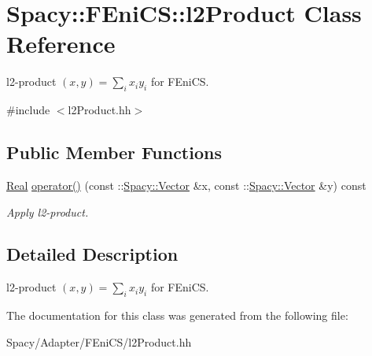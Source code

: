 \hypertarget{classSpacy_1_1FEniCS_1_1l2Product}{}\section{Spacy\+:\+:F\+Eni\+C\+S\+:\+:l2\+Product Class Reference}
\label{classSpacy_1_1FEniCS_1_1l2Product}


l2-\/product $(x,y) = \sum_i x_i y_i $ for F\+Eni\+C\+S.  




{\ttfamily \#include $<$l2\+Product.\+hh$>$}

\subsection*{Public Member Functions}
\begin{DoxyCompactItemize}
\item 
\hypertarget{classSpacy_1_1FEniCS_1_1l2Product_a795fc0d8cbced556168163265ac21406}{}\hyperlink{classSpacy_1_1Real}{Real} \hyperlink{classSpacy_1_1FEniCS_1_1l2Product_a795fc0d8cbced556168163265ac21406}{operator()} (const \+::\hyperlink{classSpacy_1_1Vector}{Spacy\+::\+Vector} \&x, const \+::\hyperlink{classSpacy_1_1Vector}{Spacy\+::\+Vector} \&y) const \label{classSpacy_1_1FEniCS_1_1l2Product_a795fc0d8cbced556168163265ac21406}

\begin{DoxyCompactList}\small\item\em Apply l2-\/product. \end{DoxyCompactList}\end{DoxyCompactItemize}


\subsection{Detailed Description}
l2-\/product $(x,y) = \sum_i x_i y_i $ for F\+Eni\+C\+S. 

The documentation for this class was generated from the following file\+:\begin{DoxyCompactItemize}
\item 
Spacy/\+Adapter/\+F\+Eni\+C\+S/l2\+Product.\+hh\end{DoxyCompactItemize}
